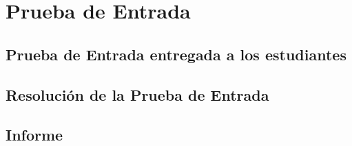 \chapter{Prueba de Entrada}
\newpage

\pagestyle{fancy} 

\vspace*{\fill}
	\centering
	\section{Prueba de Entrada entregada a los estudiantes}
\vspace*{\fill}




\vspace*{\fill}
\centering
\section{Resolución de la Prueba de Entrada}
\vspace*{\fill}




\vspace*{\fill}
\centering
\section{Informe}
\vspace*{\fill}




